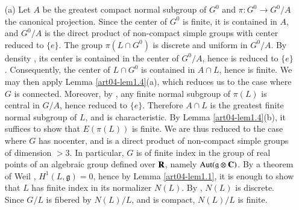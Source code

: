 \begin{itemize}
\item[(a)] Let $A$ be the greatest compact normal subgroup of $G^{0}$ and $\pi:G^{0}\to G^{0}/A$ the canonical projection. Since the center of $G^{0}$ is finite, it is contained in $A$, and $G^{0}/A$ is the direct product of non-compact simple groups with center reduced to $\{e\}$. The group $\pi(L\cap G^{0})$ is discrete and uniform in $G^{0}/A$. By density \cite{art04-key4}, its center is contained in the center of $G^{0}/A$, hence is reduced to $\{e\}$. Consequently, the center of $L\cap G^{0}$ is contained in $A\cap L$, hence is finite. We may then apply Lemma \ref{art04-lem1.4}(a), which reduces us to the case where $G$ is connected. Moreover, by \cite{art04-key4}, any finite normal subgroup of $\pi(L)$ is central in $G/A$, hence reduced to $\{e\}$. Therefore $A\cap L$ is the greatest finite normal subgroup of $L$, and is characteristic. By Lemma \ref{art04-lem1.4}(b), it suffices to show that $E(\pi(L))$ is finite. We are thus reduced to the case where $G$ has no\pageoriginale center, and is a direct product of non-compact simple groups of dimension $>3$. In particular, $G$ is of finite index in the group of real points of an algebraic group defined over $\mathbf{R}$, namely $\operatorname{\mathrm{Aut}} (\mathfrak{g}\otimes \mathbf{C})$. By a theorem of Weil \cite{art04-key33}, $H^{1}(L,\mathfrak{g})=0$, hence by Lemma \ref{art04-lem1.1}, it is enough to show that $L$ has finite index in its normalizer $N(L)$. By \cite{art04-key4}, $N(L)$ is discrete. Since $G/L$ is fibered by $N(L)/L$, and is compact, $N(L)/L$ is finite.


\end{itemize}
